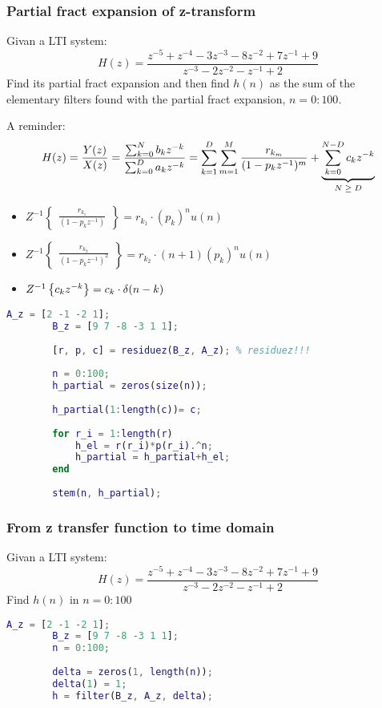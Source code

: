     \subsubsection{Partial fract expansion of z-transform}
    Givan a LTI system:
    $$
    H(z)=\frac{
        z^{-5}+z^{-4}-3z^{-3}-8z^{-2}+7z^{-1}+9
    }{
        z^{-3}-2z^{-2}-z^{-1}+2
    }
    $$
    Find its partial fract expansion and then find $h(n)$ as the sum of the elementary filters found with the partial fract expansion, $n=0:100$.
    
    A reminder:
    $$
    H(z)=\frac{Y(z)}{X(z)}=\frac{\sum_{k=0}^Nb_kz^{-k}}{\sum_{k=0}^Da_kz^{-k}}
    =
    \sum_{k=1}^D\sum_{m=1}^M\frac{
        r_{k_m}
    }{(1-p_kz^{-1})^m}+
    \underlabel{
        \sum_{k=0}^{N-D}c_kz^{-k}
    }{$N\geq D$}
    $$
    \begin{itemize}
        \item $Z^{-1}\begin{Bmatrix}
            \frac{r_{k_1}}{(1-p_kz^{-1})}
        \end{Bmatrix}=r_{k_1}\cdot (p_k)^nu(n)$
        \item $Z^{-1}\begin{Bmatrix}
            \frac{r_{k_2}}{(1-p_kz^{-1})^2}
        \end{Bmatrix}=r_{k_2}\cdot (n+1)(p_k)^nu(n)$
        \item $Z^{-1}\Brackets{c_kz^{-k}}=c_k\cdot \delta(n-k)$
    \end{itemize}
    \begin{lstlisting}[language=Matlab, escapeinside=`']
        A_z = [2 -1 -2 1];
        B_z = [9 7 -8 -3 1 1];
        
        [r, p, c] = residuez(B_z, A_z); % residuez!!!
        
        n = 0:100;
        h_partial = zeros(size(n));
        
        h_partial(1:length(c))= c;
        
        for r_i = 1:length(r)
            h_el = r(r_i)*p(r_i).^n;
            h_partial = h_partial+h_el;
        end
        
        stem(n, h_partial);
    \end{lstlisting}

    \subsubsection{From z transfer function to time domain}
    Givan a LTI system:
    $$
    H(z)=\frac{
        z^{-5}+z^{-4}-3z^{-3}-8z^{-2}+7z^{-1}+9
    }{
        z^{-3}-2z^{-2}-z^{-1}+2
    }
    $$
    Find $h(n)$ in $n=0:100$
    \begin{lstlisting}[language=Matlab, escapeinside=`']
        A_z = [2 -1 -2 1];
        B_z = [9 7 -8 -3 1 1];
        n = 0:100;
        
        delta = zeros(1, length(n));
        delta(1) = 1;
        h = filter(B_z, A_z, delta);
    \end{lstlisting}


